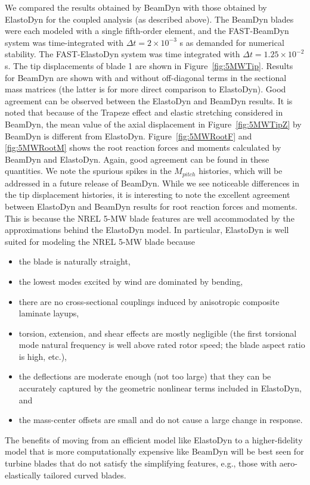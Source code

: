 \documentclass{aiaa-tc}
\begin{document}
We compared the results obtained by BeamDyn with those obtained by ElastoDyn for the coupled analysis (as described above).  The BeamDyn blades were each modeled with a single fifth-order element, and the FAST-BeamDyn system was time-integrated with $\Delta t = 2 \times 10^{-3}$ s as demanded for numerical stability.  
The FAST-ElastoDyn system was time integrated with $\Delta t = 1.25 \times 10^{-2}$ s.
The tip displacements of blade 1 are shown in Figure~\ref{fig:5MWTip}.  Results for BeamDyn are shown with and without off-diagonal terms in the sectional mass matrices (the latter is for more direct comparison to ElastoDyn).
Good agreement can be observed between the ElastoDyn and BeamDyn results. It is noted that because of the Trapeze effect and elastic stretching considered in BeamDyn, the mean value of the axial displacement in Figure~\ref{fig:5MWTipZ} by BeamDyn is different from ElastoDyn. Figure~\ref{fig:5MWRootF} and \ref{fig:5MWRootM} shows the root reaction forces and moments calculated by BeamDyn and ElastoDyn. Again, good agreement can be found in these quantities. We note the spurious spikes in the $M_{pitch}$ histories, which will be addressed in a future release of BeamDyn.  While we see noticeable differences in the tip displacement histories, it is interesting to note the excellent agreement between ElastoDyn and BeamDyn results for root reaction forces and moments.  This is because the NREL 5-MW blade features are well accommodated by the approximations behind the ElastoDyn model.  In particular, 
ElastoDyn is well suited for modeling the NREL 5-MW blade because
\begin{itemize}
\item the blade is naturally straight,
\item the lowest modes excited by wind are dominated by bending,
\item there are no cross-sectional couplings induced by anisotropic composite laminate layups,
\item torsion, extension, and shear effects are mostly negligible (the first torsional mode natural frequency is well above rated rotor speed; the blade aspect ratio is high, etc.),
\item the deflections are moderate enough (not too large) that they can be accurately captured by the geometric nonlinear terms included in ElastoDyn, and
\item the mass-center offsets are small and do not cause a large change in response.
\end{itemize}
The benefits of moving from an efficient model like ElastoDyn to a higher-fidelity model that is more computationally expensive like BeamDyn will be best seen for turbine blades that do not satisfy the simplifying features, e.g., those with aero-elastically tailored curved blades.\cite{Sri:SciTech2016}
\end{document}
